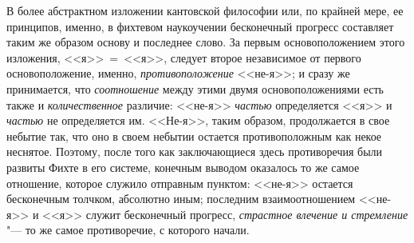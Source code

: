 В более абстрактном изложении кантовской философии или, по крайней мере, ее
принципов, именно, в фихтевом наукоучении бесконечный прогресс составляет
таким же образом основу и последнее слово. За первым основоположением этого
изложения, <<я>>~=~<<я>>, следует второе независимое от первого
основоположение, именно, {\em противоположение} <<не-я>>;
и сразу же принимается, что {\em соотношение} между
этими двумя основоположениями есть также и
{\em количественное} различие: <<не-я>>
{\em частью} определяется <<я>> и
{\em частью} не определяется им. <<Не-я>>, таким образом,
продолжается в свое небытие так, что оно в своем небытии остается
противоположным как некое неснятое. Поэтому, после того как заключающиеся
здесь противоречия были развиты Фихте в его системе, конечным выводом
оказалось то же самое отношение, которое служило отправным пунктом: <<не-я>>
остается бесконечным
толчком,
абсолютно иным; последним
взаимоотношением <<не-я>> и <<я>> служит бесконечный прогресс,
{\em страстное влечение и стремление} "--- то же самое
противоречие, с которого начали.

